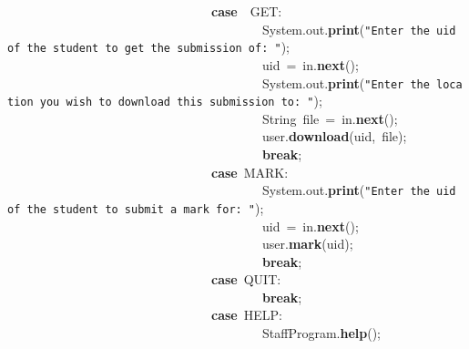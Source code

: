 \mbox{}\ \ \ \ \ \ \ \ \ \ \ \ \ \ \ \ \ \ \ \ \ \ \ \ \ \ \ \ \ \ \ \ \textbf{case}\ \ GET: \\
\mbox{}\ \ \ \ \ \ \ \ \ \ \ \ \ \ \ \ \ \ \ \ \ \ \ \ \ \ \ \ \ \ \ \ \ \ \ \ \ \ \ \ System.out.\textbf{print}(\texttt{"{}Enter\ the\ uid\ of\ the\ student\ to\ get\ the\ submission\ of:\ "{}}); \\
\mbox{}\ \ \ \ \ \ \ \ \ \ \ \ \ \ \ \ \ \ \ \ \ \ \ \ \ \ \ \ \ \ \ \ \ \ \ \ \ \ \ \ uid\ =\ in.\textbf{next}(); \\
\mbox{}\ \ \ \ \ \ \ \ \ \ \ \ \ \ \ \ \ \ \ \ \ \ \ \ \ \ \ \ \ \ \ \ \ \ \ \ \ \ \ \ System.out.\textbf{print}(\texttt{"{}Enter\ the\ location\ you\ wish\ to\ download\ this\ submission\ to:\ "{}}); \\
\mbox{}\ \ \ \ \ \ \ \ \ \ \ \ \ \ \ \ \ \ \ \ \ \ \ \ \ \ \ \ \ \ \ \ \ \ \ \ \ \ \ \ String\ file\ =\ in.\textbf{next}(); \\
\mbox{}\ \ \ \ \ \ \ \ \ \ \ \ \ \ \ \ \ \ \ \ \ \ \ \ \ \ \ \ \ \ \ \ \ \ \ \ \ \ \ \ user.\textbf{download}(uid,\ file); \\
\mbox{}\ \ \ \ \ \ \ \ \ \ \ \ \ \ \ \ \ \ \ \ \ \ \ \ \ \ \ \ \ \ \ \ \ \ \ \ \ \ \ \ \textbf{break}; \\
\mbox{}\ \ \ \ \ \ \ \ \ \ \ \ \ \ \ \ \ \ \ \ \ \ \ \ \ \ \ \ \ \ \ \ \textbf{case}\ MARK: \\
\mbox{}\ \ \ \ \ \ \ \ \ \ \ \ \ \ \ \ \ \ \ \ \ \ \ \ \ \ \ \ \ \ \ \ \ \ \ \ \ \ \ \ System.out.\textbf{print}(\texttt{"{}Enter\ the\ uid\ of\ the\ student\ to\ submit\ a\ mark\ for:\ "{}}); \\
\mbox{}\ \ \ \ \ \ \ \ \ \ \ \ \ \ \ \ \ \ \ \ \ \ \ \ \ \ \ \ \ \ \ \ \ \ \ \ \ \ \ \ uid\ =\ in.\textbf{next}(); \\
\mbox{}\ \ \ \ \ \ \ \ \ \ \ \ \ \ \ \ \ \ \ \ \ \ \ \ \ \ \ \ \ \ \ \ \ \ \ \ \ \ \ \ user.\textbf{mark}(uid); \\
\mbox{}\ \ \ \ \ \ \ \ \ \ \ \ \ \ \ \ \ \ \ \ \ \ \ \ \ \ \ \ \ \ \ \ \ \ \ \ \ \ \ \ \textbf{break}; \\
\mbox{}\ \ \ \ \ \ \ \ \ \ \ \ \ \ \ \ \ \ \ \ \ \ \ \ \ \ \ \ \ \ \ \ \textbf{case}\ QUIT: \\
\mbox{}\ \ \ \ \ \ \ \ \ \ \ \ \ \ \ \ \ \ \ \ \ \ \ \ \ \ \ \ \ \ \ \ \ \ \ \ \ \ \ \ \textbf{break}; \\
\mbox{}\ \ \ \ \ \ \ \ \ \ \ \ \ \ \ \ \ \ \ \ \ \ \ \ \ \ \ \ \ \ \ \ \textbf{case}\ HELP: \\
\mbox{}\ \ \ \ \ \ \ \ \ \ \ \ \ \ \ \ \ \ \ \ \ \ \ \ \ \ \ \ \ \ \ \ \ \ \ \ \ \ \ \ StaffProgram.\textbf{help}(); \\
